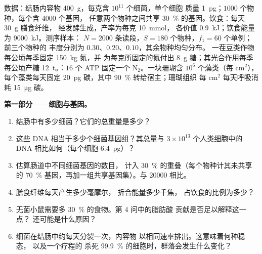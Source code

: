 \begin{problem}
\label{pb:b3:microbiomes:1}
数据：结肠内容物 \qty{400}{g}，每克含 $10^{11}$ 个细菌，单个细胞
质量 \qty{1}{pg}；$1000$ 个物种，每个含 \num{4000} 个基因，
任意两个物种之间共享 \qty{30}{\%} 的基因。饮食：每天 \qty{30}{g} 膳食纤维，
经发酵生成，产率为每克 \qty{10}{mmol}，
各价值 \qty{0.9}{kJ}；饮食能量为 \qty{9000}{kJ}。测序样本：
$N = 2000$ 条读段，$S = 180$ 个物种，$f_{1} = 60$ 个单例；前三个物种的
丰度分别为 $0.30$、$0.20$、$0.10$，其余物种均匀分布。
一茬豆类作物每公顷每季固定 \qty{150}{kg} 氮，并
为每克所固定的氮付出 \qty{8}{g} 糖；其光合作用每季每公顷产糖
\qty{12}{t}。：$16$ 个
ATP 固定一个 N$_{2}$。一块珊瑚含 $10^{6}$ 个藻类（每 cm$^{2}$），每个藻类每天固定 \qty{20}{pg}
碳，其中 \qty{90}{\%} 转给宿主；珊瑚组织
每 cm$^{2}$ 每天呼吸消耗 \qty{15}{\micro g} 碳。

\medskip
\noindent\textbf{第一部分——细胞与基因。}
\begin{enumerate}
  \item 结肠中有多少细菌？它们的总重量是多少？
  \item 这些 DNA 相当于多少个细菌基因组？其总量与
        $3\times 10^{13}$ 个人类细胞中的 DNA 相比如何（每个细胞
        \qty{6.4}{pg}）？
  \item 估算肠道中不同细菌基因的数目，
        计入 \qty{30}{\%} 的重叠（每个物种计其未共享的
        \qty{70}{\%} 基因，再加一组共享基因集）。与
        \num{20000} 相比。
  \item 膳食纤维每天产生多少毫摩尔，
        折合能量多少千焦，
        占饮食的比例为多少？
  \item 无菌小鼠需要多 \qty{30}{\%} 的食物。第 4 问中的脂肪酸
        贡献是否足以解释这一点？
        还可能是什么原因？
  \item 细菌在结肠中约每天分裂一次，内容物
        以相同速率排出。这意味着何种稳态，
        以及一个疗程的
        杀死 \qty{99.9}{\%} 的细胞时，群落会发生什么变化？
\end{enumerate}


\end{problem}
